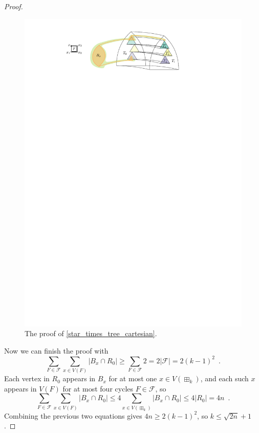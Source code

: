 \documentclass{patmorin}
\renewcommand{\ge}{\geqslant}
\renewcommand{\le}{\leqslant}
\theoremstyle{plain}
\theoremstyle{definition}
\begin{document}
\begin{proof}
  \begin{figure}[ht]
    \centering
    \includegraphics{figs/star_times_tree_cartesian}
    \caption{The proof of \cref{star_times_tree_cartesian}.}
    \label{star_times_tree_cartesian_fig}
  \end{figure}

  Now we can finish the proof with
  \[
    \sum_{F\in\mathcal{F}}\sum_{x\in V(F)} |B_x\cap R_0| \ge \sum_{F\in\mathcal{F}} 2 = 2|\mathcal{F}| = 2(k-1)^2 \enspace .
  \]
  Each vertex in $R_0$ appears in $B_x$ for at most one $x\in V(\boxplus_k)$, and each such $x$ appears in $V(F)$ for at most four cycles $F\in\mathcal{F}$, so 
  \[
    \sum_{F\in\mathcal{F}}\sum_{x\in V(F)} |B_x\cap R_0| \le 4\sum_{x\in V(\boxplus_k)} |B_x\cap R_0| \le 4|R_0| = 4n \enspace .
  \]
  Combining the previous two equations gives $4n\ge 2(k-1)^2$, so $k \le \sqrt{2n}+1$.
\end{proof}
\end{document}
